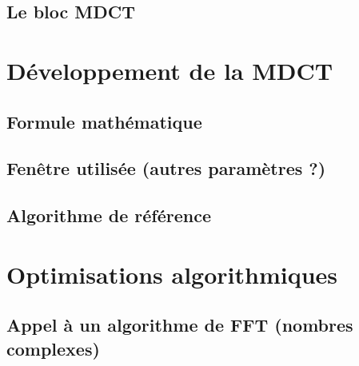 \documentclass{article}
\begin{document}


    \subsection{Le bloc MDCT}


    \section{Développement de la MDCT}
    \subsection{Formule mathématique}



    \subsection{Fenêtre utilisée (autres paramètres ?)}
    \subsection{Algorithme de référence}


    \section{Optimisations algorithmiques}
    \subsection{Appel à un algorithme de FFT (nombres complexes)}
\end{document}
